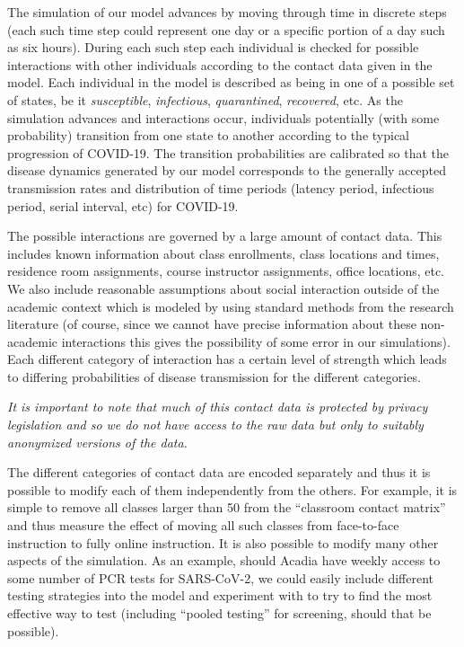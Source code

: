 \documentclass[fleqn,10pt]{SelfArx} %
\begin{document}
The simulation of our model advances by moving through time in discrete steps (each such time step could represent one day or a specific portion of a day such as six hours).
During each such step each individual is checked for possible interactions with other individuals according to the contact data given in the model.
Each individual in the model is described as being in one of a possible set of states, be it \emph{susceptible}, \emph{infectious}, \emph{quarantined}, \emph{recovered}, etc.
As the simulation advances and interactions occur, individuals potentially (with some probability) transition from one state to another according to the typical progression of COVID-19.
The transition probabilities are calibrated so that the disease dynamics generated by our model corresponds to the generally accepted transmission rates and distribution of time periods (latency period, infectious period, serial interval, etc) for COVID-19.

The possible interactions are governed by a large amount of contact data.
This includes known information about class enrollments, class locations and times, residence room assignments, course instructor assignments, office locations, etc.
We also include reasonable assumptions about social interaction outside of the academic context which is modeled by using standard methods from the research literature (of course, since we cannot have precise information about these non-academic interactions this gives the possibility of some error in our simulations).
Each different category of interaction has a certain level of strength which leads to differing probabilities of disease transmission for the different categories.

\emph{It is important to note that much of this contact data is protected by privacy legislation and so we do not have access to the raw data but only to suitably anonymized versions of the data.}

The different categories of contact data are encoded separately and thus it is possible to modify each of them independently from the others.
For example, it is simple to remove all classes larger than 50 from the ``classroom contact matrix'' and thus measure the effect of moving all such classes from face-to-face instruction to fully online instruction.
It is also possible to modify many other aspects of the simulation.
As an example, should Acadia have weekly access to some number of PCR tests for SARS-CoV-2, we could easily include different testing strategies into the model and experiment with to try to find the most effective way to test (including ``pooled testing'' for screening, should that be possible).
\end{document}
